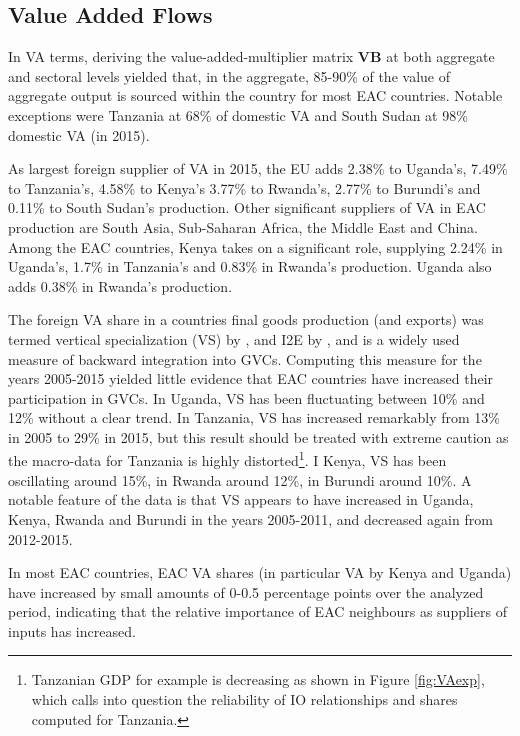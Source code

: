 \documentclass[a4paper]{article}
\begin{document}
\subsection{Value Added Flows}

In VA terms, deriving the value-added-multiplier matrix \textbf{VB} at both aggregate and sectoral levels yielded that, in the aggregate, 85-90\% of the value of aggregate output is sourced within the country for most EAC countries. Notable exceptions were Tanzania at 68\% of domestic VA and South Sudan at 98\% domestic VA (in 2015). \newline

As largest foreign supplier of VA in 2015, the EU adds 2.38\% to Uganda's, 7.49\% to Tanzania's, 4.58\% to Kenya's 3.77\% to Rwanda's, 2.77\% to Burundi's and 0.11\% to South Sudan's production. Other significant suppliers of VA in EAC production are South Asia, Sub-Saharan Africa, the Middle East and China. Among the EAC countries, Kenya takes on a significant role, supplying 2.24\% in Uganda's, 1.7\% in Tanzania's and 0.83\% in Rwanda's production. Uganda also adds 0.38\% in Rwanda's production. \newline

The foreign VA share in a countries final goods production (and exports) was termed vertical specialization (VS) by \citet{hummels2001nature}, and I2E by \citet{baldwin2015supply}, and is a widely used measure of backward integration into GVCs. Computing this measure for the years 2005-2015 yielded little evidence that EAC countries have increased their participation in GVCs. In Uganda, VS has been fluctuating between 10\% and 12\% without a clear trend. In Tanzania, VS has increased remarkably from 13\% in 2005 to 29\% in 2015, but this result should be treated with extreme caution as the macro-data for Tanzania is highly distorted\footnote{Tanzanian GDP for example is decreasing as shown in Figure \ref{fig:VAexp}, which calls into question the reliability of IO relationships and shares computed for Tanzania.}. I Kenya, VS has been oscillating around 15\%, in Rwanda around 12\%, in Burundi around 10\%. A notable feature of the data is that VS appears to have increased in Uganda, Kenya, Rwanda and Burundi in the years 2005-2011, and decreased again from 2012-2015. \newline

In most EAC countries, EAC VA shares (in particular VA by Kenya and Uganda) have increased by small amounts of 0-0.5 percentage points over the analyzed period, indicating that the relative importance of EAC neighbours as suppliers of inputs has increased. \newline
\end{document}
